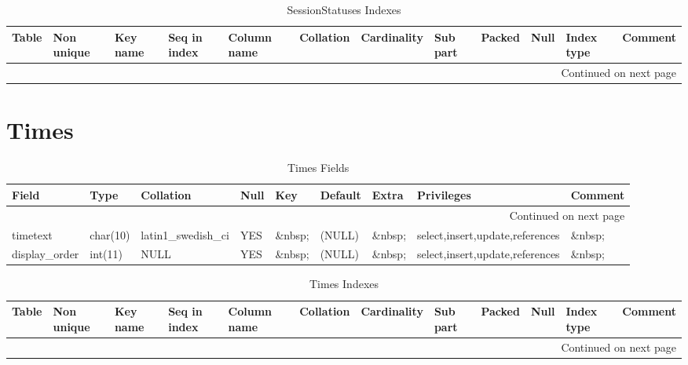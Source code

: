 \documentclass[tablesignature]{scrartcl}
\begin{document}
\begin{longtable}{|l|l|l|l|l|l|l|l|l|l|l|l|}
\caption{SessionStatuses Indexes} \label{tbl:sessionstatusesindexes}\\
\hline
 Table            &  Non unique  &  Key name  &  Seq in index  &  Column name  &  Collation  &  Cardinality  &  Sub part  &  Packed  &  Null     &  Index type  &  Comment \\
\hline
\endhead
\hline\multicolumn{12}{r}{Continued on next page}\
\endfoot
\endlastfoot
\hline
 SessionStatuses  &           0  &  PRIMARY   &             1  &  statusid     &  A          &            7  &  (NULL)    &  (NULL)  &  \&nbsp;  &  BTREE       &  \&nbsp;  \\
\hline
\end{longtable}
\section{Times}
\label{sec-31}


\begin{longtable}{|l|l|l|l|l|l|l|l|l|}
\caption{Times Fields} \label{tbl:timessfields}\\
\hline
 Field             &  Type      &  Collation                &  Null     &  Key      &  Default  &  Extra    &  Privileges                       &  Comment \\
\hline
\endhead
\hline\multicolumn{9}{r}{Continued on next page}\
\endfoot
\endlastfoot
\hline
 timeindex         &  int(11)   &  NULL                     &  \&nbsp;  &  PRI      &  0        &  \&nbsp;  &  select,insert,update,references  &  \&nbsp;  \\
 timetext          &  char(10)  &  latin1\_{}swedish\_{}ci  &  YES      &  \&nbsp;  &  (NULL)   &  \&nbsp;  &  select,insert,update,references  &  \&nbsp;  \\
 display\_{}order  &  int(11)   &  NULL                     &  YES      &  \&nbsp;  &  (NULL)   &  \&nbsp;  &  select,insert,update,references  &  \&nbsp;  \\
\hline
\end{longtable}


\begin{longtable}{|l|l|l|l|l|l|l|l|l|l|l|l|}
\caption{Times Indexes} \label{tbl:timesindexes}\\
\hline
 Table  &  Non unique  &  Key name  &  Seq in index  &  Column name  &  Collation  &  Cardinality  &  Sub part  &  Packed  &  Null     &  Index type  &  Comment \\
\hline
\endhead
\hline\multicolumn{12}{r}{Continued on next page}\
\endfoot
\endlastfoot
\hline
 Times  &           0  &  PRIMARY   &             1  &  timeindex    &  A          &           24  &  (NULL)    &  (NULL)  &  \&nbsp;  &  BTREE       &  \&nbsp;  \\
\hline
\end{longtable}
\end{document}
